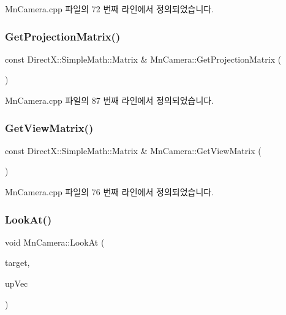 Mn\+Camera.\+cpp 파일의 72 번째 라인에서 정의되었습니다.

\mbox{\label{class_m_n_l_1_1_mn_camera_a7b8773bec079b174185732f80e32d943}} 
\subsubsection{\texorpdfstring{Get\+Projection\+Matrix()}{GetProjectionMatrix()}}
{\footnotesize\ttfamily const Direct\+X\+::\+Simple\+Math\+::\+Matrix \& Mn\+Camera\+::\+Get\+Projection\+Matrix (\begin{DoxyParamCaption}{ }\end{DoxyParamCaption})}



Mn\+Camera.\+cpp 파일의 87 번째 라인에서 정의되었습니다.

\mbox{\label{class_m_n_l_1_1_mn_camera_a5b4d56e3d1d459da5c346831b1e43510}} 
\subsubsection{\texorpdfstring{Get\+View\+Matrix()}{GetViewMatrix()}}
{\footnotesize\ttfamily const Direct\+X\+::\+Simple\+Math\+::\+Matrix \& Mn\+Camera\+::\+Get\+View\+Matrix (\begin{DoxyParamCaption}{ }\end{DoxyParamCaption})}



Mn\+Camera.\+cpp 파일의 76 번째 라인에서 정의되었습니다.

\mbox{\label{class_m_n_l_1_1_mn_camera_ad7fb1372db13a5ce955000a9597a9d48}} 
\subsubsection{\texorpdfstring{Look\+At()}{LookAt()}}
{\footnotesize\ttfamily void Mn\+Camera\+::\+Look\+At (\begin{DoxyParamCaption}\item[{const Direct\+X\+::\+Simple\+Math\+::\+Vector3 \&}]{target,  }\item[{const Direct\+X\+::\+Simple\+Math\+::\+Vector3 \&}]{up\+Vec }\end{DoxyParamCaption})}



